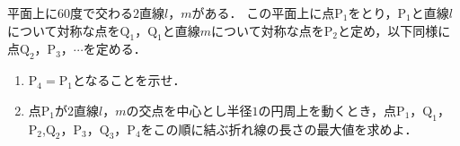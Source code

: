 \documentclass[../../main.tex]{subfiles}
\begin{document}
平面上に$60$度で交わる$2$直線$l$，$m$がある．
この平面上に点$\mathrm{P}_1$をとり，$\mathrm{P}_1$と直線$l$について対称な点を$\mathrm{Q}_1$，$\mathrm{Q}_1$と直線$m$について対称な点を$\mathrm{P}_2$と定め，以下同様に点$\mathrm{Q}_2$，$\mathrm{P}_3$，$\cdots$を定める．

\begin{enumerate}
  \item $\mathrm{P}_4=\mathrm{P}_1$となることを示せ．
  \item 点$\mathrm{P}_1$が$2$直線$l$，$m$の交点を中心とし半径$1$の円周上を動くとき，点$\mathrm{P}_1$，$\mathrm{Q}_1$，$\mathrm{P}_2$,$\mathrm{Q}_2$，$\mathrm{P}_3$，$\mathrm{Q}_3$，$\mathrm{P}_4$をこの順に結ぶ折れ線の長さの最大値を求めよ．
\end{enumerate}
\end{document}
